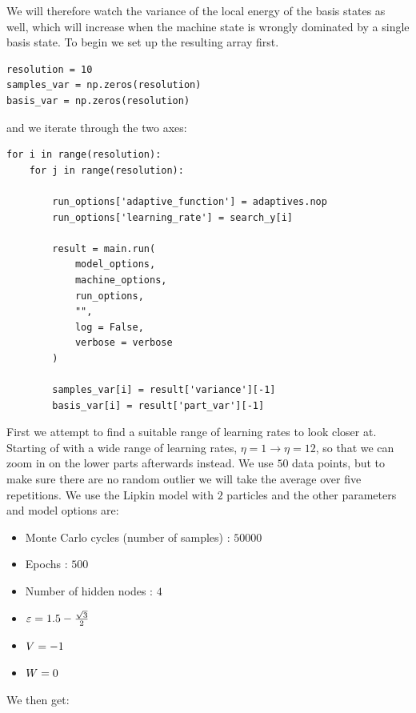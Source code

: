 We will therefore watch the variance of the local energy of the basis states as well, which will increase when the machine state is wrongly dominated by a single basis state. To begin we set up the resulting array first.

\begin{verbatim}
resolution = 10
samples_var = np.zeros(resolution)
basis_var = np.zeros(resolution)
\end{verbatim}

and we iterate through the two axes:

\begin{verbatim}
for i in range(resolution):
    for j in range(resolution):
        
        run_options['adaptive_function'] = adaptives.nop
        run_options['learning_rate'] = search_y[i]

        result = main.run(
            model_options,
            machine_options,
            run_options,
            "",
            log = False,
            verbose = verbose
        )
        
        samples_var[i] = result['variance'][-1]
        basis_var[i] = result['part_var'][-1]
\end{verbatim}

First we attempt to find a suitable range of learning rates to look closer at. Starting of with a wide range of learning rates, $\eta =1 \rightarrow \eta = 12$, so that we can zoom in on the lower parts afterwards instead.  We use $50$ data points, but to make sure there are no random outlier we will take the average over five repetitions. We use the Lipkin model with $2$ particles and the other parameters and model options are:

\begin{itemize}
  \item Monte Carlo cycles (number of samples) : $50 000$
  \item Epochs : $500$
  \item Number of hidden nodes : $4$
  \item $\varepsilon = 1.5 - \frac{\sqrt{3}}{2}$
  \item $V = -1$
  \item $W = 0$
\end{itemize}

We then get:

